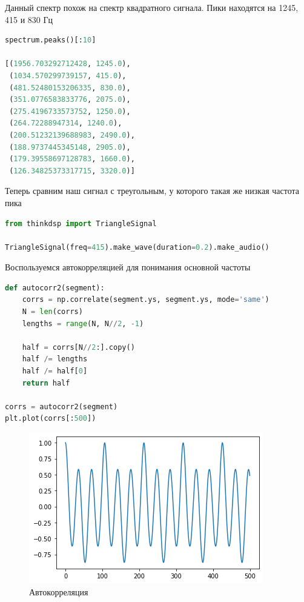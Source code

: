 Данный спектр похож на спектр квадратного сигнала. Пики находятся на 1245, 415 и 830 Гц

\begin{lstlisting}[language=Python]
spectrum.peaks()[:10]

[(1956.703292712428, 1245.0),
 (1034.570299739157, 415.0),
 (481.52480153206335, 830.0),
 (351.0776583833776, 2075.0),
 (275.4196733573752, 1250.0),
 (264.72288947314, 1240.0),
 (200.51232139688983, 2490.0),
 (188.9737445345148, 2905.0),
 (179.39558697128783, 1660.0),
 (126.34825373317715, 3320.0)]
\end{lstlisting}

Теперь сравним наш сигнал с треугольным, у которого такая же низкая частота пика

\begin{lstlisting}[language=Python]
from thinkdsp import TriangleSignal

TriangleSignal(freq=415).make_wave(duration=0.2).make_audio()
\end{lstlisting}

Воспользуемся автокорреляцией для понимания основной частоты

\begin{lstlisting}[language=Python]
def autocorr2(segment):
    corrs = np.correlate(segment.ys, segment.ys, mode='same')
    N = len(corrs)
    lengths = range(N, N//2, -1)

    half = corrs[N//2:].copy()
    half /= lengths
    half /= half[0]
    return half
    
corrs = autocorr2(segment)
plt.plot(corrs[:500])
\end{lstlisting}

\begin{figure}[H]
	\begin{center}
		\includegraphics[scale=1]{fig/lab05/lab05_12.png}
		\caption{Автокорреляция}
	\end{center}
\end{figure}

